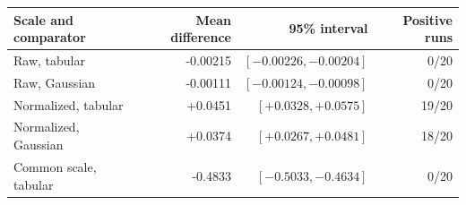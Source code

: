 \begin{tabular}{lrrr}
\toprule
Scale and comparator & Mean difference & 95\% interval & Positive runs\\
\midrule
Raw, tabular & -0.00215 & $[-0.00226,-0.00204]$ & 0/20\\
Raw, Gaussian & -0.00111 & $[-0.00124,-0.00098]$ & 0/20\\
Normalized, tabular & +0.0451 & $[+0.0328,+0.0575]$ & 19/20\\
Normalized, Gaussian & +0.0374 & $[+0.0267,+0.0481]$ & 18/20\\
Common scale, tabular & -0.4833 & $[-0.5033,-0.4634]$ & 0/20\\
\bottomrule
\end{tabular}
